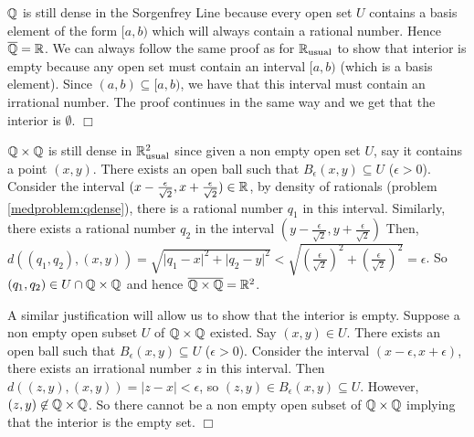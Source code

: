 \documentclass{article}
\begin{document}
{\begin{spacedenumerate}
    \item $\mathbb{Q}$ is still dense in the Sorgenfrey Line because every open set $U$ contains a basis element of the form $[a,b)$ which will always contain a rational number. Hence $\overline{\mathbb{Q}} = \mathbb{R}$. We can always follow the same proof as for $\mathbb{R}_{\text{usual}}$ to show that interior is empty because any open set must contain an interval $[a,b)$ (which is a basis element). Since $(a,b)\subseteq [a,b)$, we have that this interval must contain an irrational number. The proof continues in the same way and we get that the interior is $\emptyset$. $\Box$
    \item $\mathbb{Q}\times \mathbb{Q}$ is still dense in $\mathbb{R}_{\text{usual}}^{2}$ since given a non empty open set $U$, say it contains a point $(x,y)$. There exists an open ball such that $B_{\epsilon}(x,y)\subseteq U$ ($\epsilon > 0$). Consider the interval $(x-\frac{\epsilon}{\sqrt{2}}, x+\frac{\epsilon}{\sqrt{2}})\in \mathbb{R}$, by density of rationals (problem \ref{medproblem:qdense}), there is a rational number $q_{1}$ in this interval. Similarly, there exists a rational number $q_{2}$ in the interval $(y-\frac{\epsilon}{\sqrt{2}}, y + \frac{\epsilon}{\sqrt{2}})$  Then, $d((q_{1},q_{2}), (x,y)) = \sqrt{\lvert q_{1}- x\rvert^{2} + \lvert q_{2} - y\rvert^{2}} < \sqrt{\left(\frac{\epsilon}{\sqrt{2}}\right)^{2} + \left(\frac{\epsilon}{\sqrt{2}}\right)^{2}} = \epsilon$. So $(q_{1}, q_{2}) \in U\cap \mathbb{Q}\times \mathbb{Q}$ and hence $\overline{\mathbb{Q}\times \mathbb{Q}} = \mathbb{R}^{2}$.
    
    A similar justification will allow us to show that the interior is empty. Suppose a non empty open subset $U$ of $\mathbb{Q}\times \mathbb{Q}$ existed. Say $(x,y)\in U$. There exists an open ball such that $B_{\epsilon}(x,y)\subseteq U$ ($\epsilon > 0$). Consider the interval $(x-\epsilon, x + \epsilon)$, there exists an irrational number $z$ in this interval. Then $d((z,y),(x,y)) = \lvert z-x\rvert < \epsilon$, so $(z,y)\in B_{\epsilon}(x,y)\subseteq U$. However, $(z,y)\not\in \mathbb{Q}\times\mathbb{Q}$. So there cannot be a non empty open subset of $\mathbb{Q}\times \mathbb{Q}$ implying that the interior is the empty set.  $\Box$
\end{spacedenumerate}
}
\end{document}
